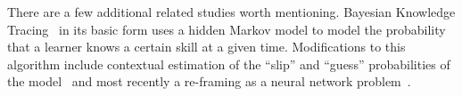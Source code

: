 There are a few additional related studies worth mentioning.
Bayesian Knowledge Tracing~\cite{Corbett:1994:UMUAI} in its basic form uses
a hidden Markov model to model the probability that a learner knows a
certain skill at a given time. Modifications to this algorithm include
contextual estimation of the ``slip'' and ``guess'' probabilities of the
model~\cite{Baker:2008:ITS} and most recently a re-framing as a neural
network problem~\cite{Piech:2015:NIPS}.

